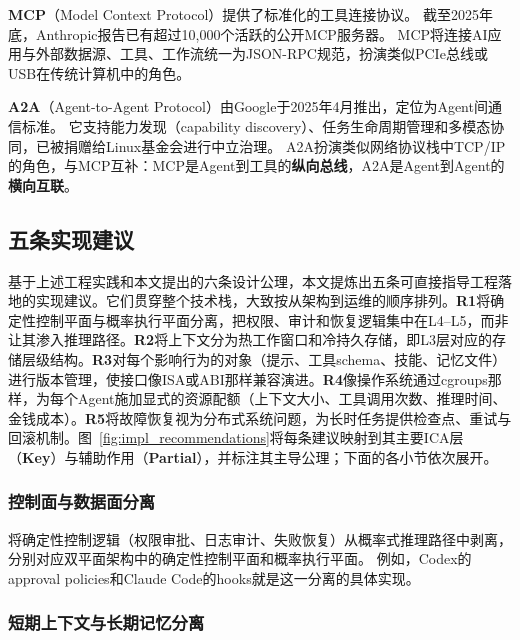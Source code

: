 \textbf{MCP}（Model Context Protocol）提供了标准化的工具连接协议\cite{mcp_intro_2026}。
截至2025年底，Anthropic报告已有超过10{,}000个活跃的公开MCP服务器\cite{mcpadoption2026}。
MCP将连接AI应用与外部数据源、工具、工作流统一为JSON-RPC规范，扮演类似PCIe总线或USB在传统计算机中的角色。

\textbf{A2A}（Agent-to-Agent Protocol）由Google于2025年4月推出，定位为Agent间通信标准\cite{google_a2a_2025,agentprotocols2025}。
它支持能力发现（capability discovery）、任务生命周期管理和多模态协同，已被捐赠给Linux基金会进行中立治理\cite{a2alinux2025}。
A2A扮演类似网络协议栈中TCP/IP的角色，与MCP互补：MCP是Agent到工具的\textbf{纵向总线}，A2A是Agent到Agent的\textbf{横向互联}。

\subsection{五条实现建议}
\label{sec:impl-recommendations}

基于上述工程实践和本文提出的六条设计公理，本文提炼出五条可直接指导工程落地的实现建议。它们贯穿整个技术栈，大致按从架构到运维的顺序排列。\textbf{R1}将确定性控制平面与概率执行平面分离，把权限、审计和恢复逻辑集中在L4--L5，而非让其渗入推理路径。\textbf{R2}将上下文分为热工作窗口和冷持久存储，即L3层对应的存储层级结构。\textbf{R3}对每个影响行为的对象（提示、工具schema、技能、记忆文件）进行版本管理，使接口像ISA或ABI那样兼容演进。\textbf{R4}像操作系统通过cgroups那样，为每个Agent施加显式的资源配额（上下文大小、工具调用次数、推理时间、金钱成本）。\textbf{R5}将故障恢复视为分布式系统问题，为长时任务提供检查点、重试与回滚机制。图~\ref{fig:impl_recommendations}将每条建议映射到其主要ICA层（\textbf{Key}）与辅助作用（\textbf{Partial}），并标注其主导公理；下面的各小节依次展开。



\subsubsection{控制面与数据面分离}

将确定性控制逻辑（权限审批、日志审计、失败恢复）从概率式推理路径中剥离，分别对应双平面架构中的确定性控制平面和概率执行平面。
例如，Codex的approval policies和Claude Code的hooks就是这一分离的具体实现\cite{openai_codex_approvals_2026,anthropic_claudecode_security_2026}。

\subsubsection{短期上下文与长期记忆分离}

